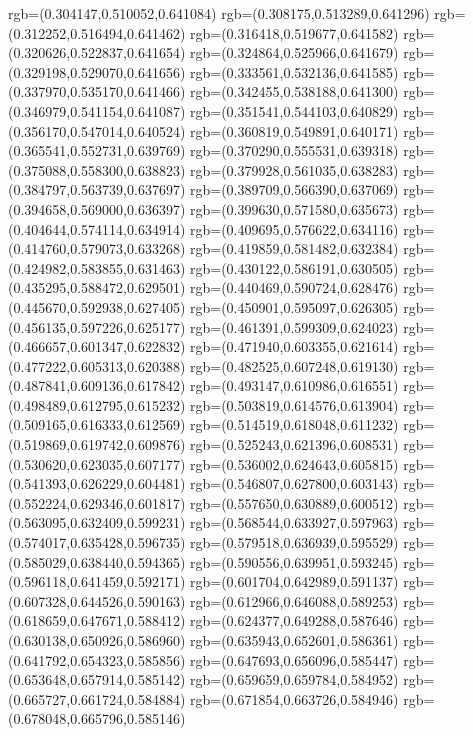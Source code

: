 {{{			rgb=(0.304147,0.510052,0.641084)
			rgb=(0.308175,0.513289,0.641296)
			rgb=(0.312252,0.516494,0.641462)
			rgb=(0.316418,0.519677,0.641582)
			rgb=(0.320626,0.522837,0.641654)
			rgb=(0.324864,0.525966,0.641679)
			rgb=(0.329198,0.529070,0.641656)
			rgb=(0.333561,0.532136,0.641585)
			rgb=(0.337970,0.535170,0.641466)
			rgb=(0.342455,0.538188,0.641300)
			rgb=(0.346979,0.541154,0.641087)
			rgb=(0.351541,0.544103,0.640829)
			rgb=(0.356170,0.547014,0.640524)
			rgb=(0.360819,0.549891,0.640171)
			rgb=(0.365541,0.552731,0.639769)
			rgb=(0.370290,0.555531,0.639318)
			rgb=(0.375088,0.558300,0.638823)
			rgb=(0.379928,0.561035,0.638283)
			rgb=(0.384797,0.563739,0.637697)
			rgb=(0.389709,0.566390,0.637069)
			rgb=(0.394658,0.569000,0.636397)
			rgb=(0.399630,0.571580,0.635673)
			rgb=(0.404644,0.574114,0.634914)
			rgb=(0.409695,0.576622,0.634116)
			rgb=(0.414760,0.579073,0.633268)
			rgb=(0.419859,0.581482,0.632384)
			rgb=(0.424982,0.583855,0.631463)
			rgb=(0.430122,0.586191,0.630505)
			rgb=(0.435295,0.588472,0.629501)
			rgb=(0.440469,0.590724,0.628476)
			rgb=(0.445670,0.592938,0.627405)
			rgb=(0.450901,0.595097,0.626305)
			rgb=(0.456135,0.597226,0.625177)
			rgb=(0.461391,0.599309,0.624023)
			rgb=(0.466657,0.601347,0.622832)
			rgb=(0.471940,0.603355,0.621614)
			rgb=(0.477222,0.605313,0.620388)
			rgb=(0.482525,0.607248,0.619130)
			rgb=(0.487841,0.609136,0.617842)
			rgb=(0.493147,0.610986,0.616551)
			rgb=(0.498489,0.612795,0.615232)
			rgb=(0.503819,0.614576,0.613904)
			rgb=(0.509165,0.616333,0.612569)
			rgb=(0.514519,0.618048,0.611232)
			rgb=(0.519869,0.619742,0.609876)
			rgb=(0.525243,0.621396,0.608531)
			rgb=(0.530620,0.623035,0.607177)
			rgb=(0.536002,0.624643,0.605815)
			rgb=(0.541393,0.626229,0.604481)
			rgb=(0.546807,0.627800,0.603143)
			rgb=(0.552224,0.629346,0.601817)
			rgb=(0.557650,0.630889,0.600512)
			rgb=(0.563095,0.632409,0.599231)
			rgb=(0.568544,0.633927,0.597963)
			rgb=(0.574017,0.635428,0.596735)
			rgb=(0.579518,0.636939,0.595529)
			rgb=(0.585029,0.638440,0.594365)
			rgb=(0.590556,0.639951,0.593245)
			rgb=(0.596118,0.641459,0.592171)
			rgb=(0.601704,0.642989,0.591137)
			rgb=(0.607328,0.644526,0.590163)
			rgb=(0.612966,0.646088,0.589253)
			rgb=(0.618659,0.647671,0.588412)
			rgb=(0.624377,0.649288,0.587646)
			rgb=(0.630138,0.650926,0.586960)
			rgb=(0.635943,0.652601,0.586361)
			rgb=(0.641792,0.654323,0.585856)
			rgb=(0.647693,0.656096,0.585447)
			rgb=(0.653648,0.657914,0.585142)
			rgb=(0.659659,0.659784,0.584952)
			rgb=(0.665727,0.661724,0.584884)
			rgb=(0.671854,0.663726,0.584946)
			rgb=(0.678048,0.665796,0.585146)
}}}
